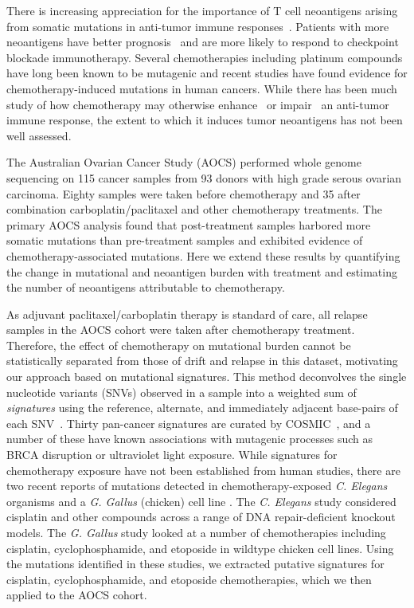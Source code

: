 There is increasing appreciation for the importance of T cell neoantigens arising from somatic mutations in anti-tumor immune responses~\cite{Schumacher_2015}. Patients with more neoantigens have better prognosis~\cite{Brown_2014} and are more likely to respond to checkpoint blockade immunotherapy\cite{Van_Allen_2015,Rizvi_2015}. Several chemotherapies including platinum compounds have long been known to be mutagenic\cite{Hannan_1989} and recent studies have found evidence for chemotherapy-induced mutations in human cancers\cite{Murugaesu_2015,Johnson_2013}. While there has been much study of how chemotherapy may otherwise enhance~\cite{Hato_2012,Machiels2001,Hodge2013} or impair~\cite{Litterman_2013} an anti-tumor immune response, the extent to which it induces tumor neoantigens has not been well assessed.

The Australian Ovarian Cancer Study (AOCS) performed whole genome sequencing on 115 cancer samples from 93 donors with high grade serous ovarian carcinoma\cite{Patch_2015}. Eighty samples were taken before chemotherapy and 35 after combination carboplatin/paclitaxel and other chemotherapy treatments. The primary AOCS analysis found that post-treatment samples harbored more somatic mutations than pre-treatment samples and exhibited evidence of chemotherapy-associated mutations. Here we extend these results by quantifying the change in mutational and neoantigen burden with treatment and estimating the number of neoantigens attributable to chemotherapy.

As adjuvant paclitaxel/carboplatin therapy is standard of care, all relapse samples in the AOCS cohort were taken after chemotherapy treatment. Therefore, the effect of chemotherapy on mutational burden cannot be statistically separated from those of drift and relapse in this dataset, motivating our approach based on mutational signatures. This method deconvolves the single nucleotide variants (SNVs) observed in a sample into a weighted sum of \textit{signatures} using the reference, alternate, and immediately adjacent base-pairs of each SNV~\cite{Alexandrov2013}. Thirty pan-cancer signatures are curated by COSMIC~\cite{364242}, and a number of these have known associations with mutagenic processes such as BRCA disruption or ultraviolet light exposure. While signatures for chemotherapy exposure have not been established from human studies, there are two recent reports of mutations detected in chemotherapy-exposed \textit{C. Elegans} organisms\cite{Meier_2014} and a \textit{G. Gallus} (chicken) cell line \cite{Szikriszt_2016}. The \textit{C. Elegans} study considered cisplatin and other compounds across a range of DNA repair-deficient knockout models. The \textit{G. Gallus} study looked at a number of chemotherapies including cisplatin, cyclophosphamide, and etoposide in wildtype chicken cell lines. Using the mutations identified in these studies, we extracted putative signatures for cisplatin, cyclophosphamide, and etoposide chemotherapies, which we then applied to the AOCS cohort.